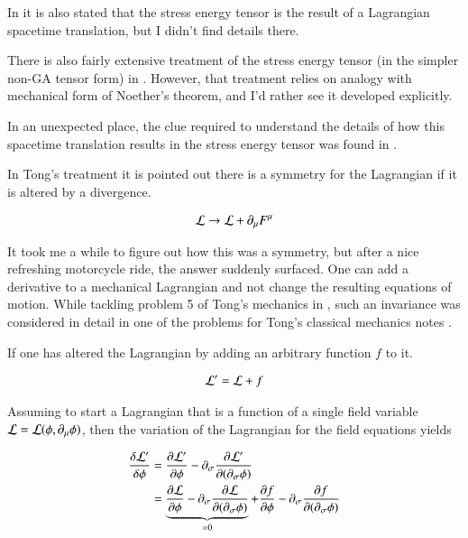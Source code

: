 \documentclass{article}
\begin{document}
In \cite{srednicki2007qft} it is also stated that the stress energy tensor
is the result of a Lagrangian spacetime translation, but I didn't find
details there.

There is also fairly extensive treatment
of the stress energy tensor (in the simpler non-GA tensor form) in
\cite{jackson1975cew}.  However, that treatment relies on analogy with
mechanical form of Noether's theorem, and I'd rather see it developed
explicitly.

In an unexpected place, the 
clue required to understand the details of 
how this spacetime translation results in the stress energy tensor
was found in
\cite{TongQFT}.

In Tong's treatment it is pointed out there is a symmetry for the Lagrangian
if it is altered by a divergence.

\begin{align*}
\mathcal{L} \rightarrow \mathcal{L} + \partial_\mu F^\mu
\end{align*}

It took me a while to figure out how this was a symmetry, but after a
nice refreshing motorcycle ride, the answer suddenly surfaced.  One
can add a derivative to a mechanical Lagrangian and not change
the resulting equations of motion.  While tackling problem 5 of 
Tong's mechanics
in 
\cite{PJTongMf1}
, such an invariance was considered in
detail in one of the problems for Tong's classical mechanics notes
.

%
If one has altered the Lagrangian by adding an arbitrary function $f$
to it.

\begin{align*}
\mathcal{L}' = \mathcal{L} + f
\end{align*}

Assuming to start a Lagrangian that is a function of a single field variable
$\mathcal{L} = \mathcal{L}(\phi, \partial_\mu \phi)$, then the 
variation of the Lagrangian for the field equations yields

\begin{align*}
\frac{\delta \mathcal{L}'}{\delta \phi}
&=
\frac{\partial \mathcal{L}'}{\partial \phi}
- 
\partial_\sigma \frac{\partial \mathcal{L}'}{\partial (\partial_\sigma \phi)} \\
&=
\underbrace{\frac{\partial \mathcal{L}}{\partial \phi}
- 
\partial_\sigma \frac{\partial \mathcal{L}}{\partial (\partial_\sigma \phi)} }_{=0}
+\frac{\partial f}{\partial \phi}
- 
\partial_\sigma \frac{\partial f}{\partial (\partial_\sigma \phi)} \\
\end{align*}
\end{document}
